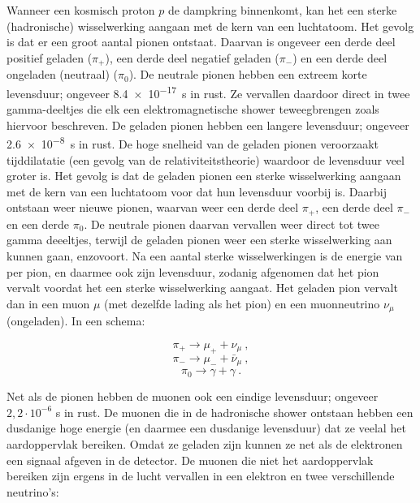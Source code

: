 Wanneer een kosmisch proton $p$ de dampkring binnenkomt, kan het een
sterke (hadronische) wisselwerking aangaan met de kern van een
luchtatoom. Het gevolg is dat er een groot aantal pionen ontstaat.
Daarvan is ongeveer een derde deel positief geladen ($\pi_{+}$), een
derde deel negatief geladen ($\pi_{-}$) en  een derde deel ongeladen
(neutraal) ($\pi_{0}$). De neutrale pionen hebben een extreem korte
levensduur; ongeveer \SI{8,4e-17}{\second} in rust. Ze vervallen daardoor
direct in twee gamma-deeltjes die elk een elektromagnetische shower
teweegbrengen zoals hiervoor beschreven. De geladen pionen hebben een
langere levensduur; ongeveer \SI{2,6e-8}{\second} in rust. De hoge snelheid
van de geladen pionen veroorzaakt tijddilatatie (een gevolg van de
relativiteitstheorie) waardoor de levensduur veel groter is. Het gevolg
is dat de geladen pionen een sterke wisselwerking aangaan met de kern
van een luchtatoom voor dat hun levensduur voorbij is. Daarbij ontstaan
weer nieuwe pionen, waarvan weer een derde deel $\pi_{+}$, een derde
deel $\pi_{-}$ en een derde $\pi_{0}$. De neutrale pionen daarvan
vervallen weer direct tot twee gamma deeeltjes, terwijl de geladen
pionen weer een sterke wisselwerking aan kunnen gaan, enzovoort. Na een
aantal sterke wisselwerkingen is de energie van per pion, en daarmee ook
zijn levensduur, zodanig afgenomen dat het pion vervalt voordat het een
sterke wisselwerking aangaat. Het geladen pion vervalt dan in een muon
$\mu$ (met dezelfde lading als het pion) en een muonneutrino $\nu_\mu$
(ongeladen). In een schema:

\begin{equation}
\pi_{+} \rightarrow \mu_{+} + \nu_\mu \ , \nonumber
\end{equation}
\begin{equation}
\pi_{-} \rightarrow \mu_{-} + \bar{\nu}_\mu \ , \nonumber
\end{equation}
\begin{equation}  
\pi_{0} \rightarrow \gamma + \gamma \ . \nonumber
\end{equation}

Net als de pionen hebben de muonen ook een eindige levensduur; ongeveer
$2,2 \cdot 10^{-6}$ s in rust. De muonen die in de hadronische shower
ontstaan hebben een dusdanige hoge energie (en daarmee een dusdanige
levensduur) dat ze veelal het aardoppervlak bereiken. Omdat ze geladen
zijn kunnen ze net als de elektronen een signaal afgeven in de \hisparc
detector. De muonen die niet het aardoppervlak bereiken zijn ergens in
de lucht vervallen in een elektron en twee verschillende neutrino's:

